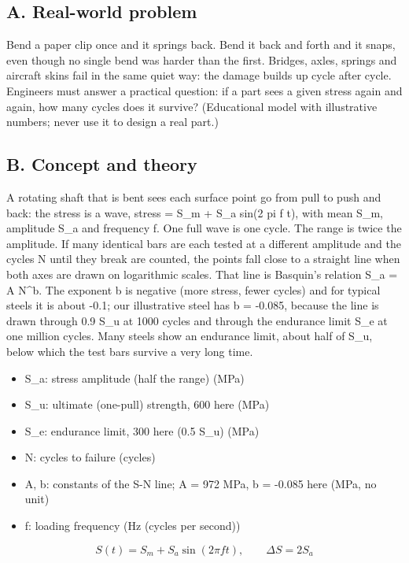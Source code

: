 \documentclass[11pt,a4paper]{article}
\begin{document}
\subsection*{A. Real-world problem}
Bend a paper clip once and it springs back. Bend it back and forth and it snaps, even though no single bend was harder than the first. Bridges, axles, springs and aircraft skins fail in the same quiet way: the damage builds up cycle after cycle. Engineers must answer a practical question: if a part sees a given stress again and again, how many cycles does it survive? (Educational model with illustrative numbers; never use it to design a real part.)

\subsection*{B. Concept and theory}
A rotating shaft that is bent sees each surface point go from pull to push and back: the stress is a wave, stress = S\_m + S\_a sin(2 pi f t), with mean S\_m, amplitude S\_a and frequency f. One full wave is one cycle. The range is twice the amplitude. If many identical bars are each tested at a different amplitude and the cycles N until they break are counted, the points fall close to a straight line when both axes are drawn on logarithmic scales. That line is Basquin's relation S\_a = A N\textasciicircum{}b. The exponent b is negative (more stress, fewer cycles) and for typical steels it is about -0.1; our illustrative steel has b = -0.085, because the line is drawn through 0.9 S\_u at 1000 cycles and through the endurance limit S\_e at one million cycles. Many steels show an endurance limit, about half of S\_u, below which the test bars survive a very long time.

\begin{itemize}[nosep]
\item S\_a: stress amplitude (half the range) (MPa)
\item S\_u: ultimate (one-pull) strength, 600 here (MPa)
\item S\_e: endurance limit, 300 here (0.5 S\_u) (MPa)
\item N: cycles to failure (cycles)
\item A, b: constants of the S-N line; A = 972 MPa, b = -0.085 here (MPa, no unit)
\item f: loading frequency (Hz (cycles per second))
\end{itemize}

\begin{equation*}
S(t)=S_m+S_a\sin(2\pi f t),\qquad \Delta S = 2S_a
\end{equation*}
\end{document}
